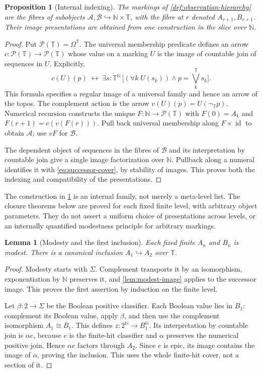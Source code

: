 \documentclass[11pt,a4paper]{article}
\numberwithin{equation}{section}
\newtheorem{proposition}[proposition]{Proposition}
\newtheorem{lemma}[lemma]{Lemma}
\theoremstyle{definition}
\theoremstyle{remark}
\theoremstyle{plain}
\newcommand{\N}{\mathbb N}
\newcommand{\TV}{\mathbb T}
\newcommand{\Pow}{\mathcal P}
\newcommand{\id}{\operatorname{id}}
\newcommand{\incl}{\hookrightarrow}
\newcommand{\negT}{\neg_{\TV}}
\newcommand{\joinT}{\bigvee^{\TV}}
\begin{document}
\begin{proposition}[Internal indexing]
\label{prop:hierarchy-indexing}
The markings of \cref{def:observation-hierarchy} are the fibres of
subobjects $\mathcal A,\mathcal B\incl\N\times\TV$, with the fibre
at $r$ denoted $A_{r+1},B_{r+1}$. Their image presentations are obtained
from one construction in the slice over $\N$.
\end{proposition}
\begin{proof}
Put $\Pow(\TV)=\Omega^{\TV}$. The universal membership predicate
defines an arrow $c:\Pow(\TV)\to\Pow(\TV)$ whose value on a marking
$U$ is the image of countable join of sequences in $U$. Explicitly,
\begin{equation}\label{eq:powerobject-completion}
 c(U)(p)\;\longleftrightarrow\;
 \exists s:\TV^{\N}\,
 \bigl[(\forall k\;U(s_k))\wedge p=\joinT_k s_k\bigr].
\end{equation}
This formula specifies a regular image of a universal family and hence
an arrow of the topos. The complement action is the arrow
$v(U)(p)=U(\negT p)$. Numerical recursion constructs the unique
$F:\N\to\Pow(\TV)$ with $F(0)=A_1$ and $F(r+1)=c(v(F(r)))$.
Pull back universal membership along $F\times\id$ to obtain
$\mathcal A$; use $vF$ for $\mathcal B$.

The dependent object of sequences in the fibres of $\mathcal B$ and
its interpretation by countable join give a single image factorization
over $\N$. Pullback along a numeral identifies it with
\eqref{eq:successor-cover}, by stability of images. This proves both
the indexing and compatibility of the presentations.
\end{proof}

The construction in \cref{prop:hierarchy-indexing} is an internal
family, not merely a meta-level list. The closure theorems below are
proved for each fixed finite level, with arbitrary object parameters.
They do not assert a uniform choice of presentations across levels, or
an internally quantified modestness principle for arbitrary markings.

\begin{lemma}[Modesty and the first inclusion]
\label{lem:hierarchy-base}
Each fixed finite $A_n$ and $B_n$ is modest. There is a canonical
inclusion $A_1\incl A_2$ over $\TV$.
\end{lemma}
\begin{proof}
Modesty starts with $\Sigma$. Complement transports it by an
isomorphism, exponentiation by $\N$ preserves it, and
\cref{lem:modest-image} applies to the successor image. This proves
the first assertion by induction on the finite level.

Let $\beta:2\to\Sigma$ be the Boolean positive classifier. Each
Boolean value lies in $B_1$: complement its Boolean value, apply
$\beta$, and then use the complement isomorphism $A_1\cong B_1$.
This defines $z:2^{\N}\to B_1^{\N}$. Its interpretation by countable
join is $\alpha e$, because $e$ is the finite-hit classifier and
$\alpha$ preserves the numerical positive join. Hence $\alpha e$
factors through $A_2$. Since $e$ is epic, its image contains the image
of $\alpha$, proving the inclusion. This uses the whole finite-hit
cover, not a section of it.
\end{proof}
\end{document}
